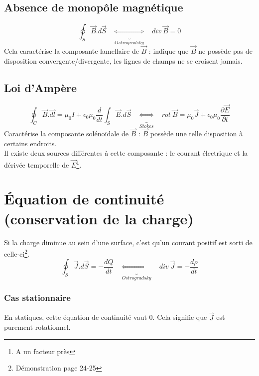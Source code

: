 \documentclass[11pt, a4paper, openany]{book}
\begin{document}
		\subsection{Absence de monopôle magnétique}
		\begin{equation}
		\oint_S \vec{B}.d\vec{S}\ \ \ \ \underbrace{\Leftrightarrow}_{Ostrogradsky}\ \ \ \ div\ \vec{B} = 0
		\end{equation}
		Cela caractérise la composante lamellaire de $\vec{B}$ : indique que $\vec{B}$ ne possède pas de disposition convergente/divergente, les lignes de champs ne se croisent jamais. \\
		
		
		\subsection{Loi d'Ampère}
		\begin{equation}
		\oint_C \vec{B}.\vec{dl} = \mu_0 I + \epsilon_0\mu_0\dfrac{d}{dt}\int_S \vec{E}.d\vec{S}\ \ \ \ \underbrace{\Leftrightarrow}_{Stokes}\ \ \ \ rot\ \vec{B} = \mu_0\vec{J} + \epsilon_0\mu_0 \dfrac{\partial \vec{E}}{\partial t}
		\end{equation}
		Caractérise la composante solénoïdale de $\vec{B}$ : $\vec{B}$ possède une telle disposition à certains endroits.\\
		Il existe deux sources différentes à cette composante : le courant électrique et la dérivée temporelle de $\vec{E}$\footnote{A un facteur près}.\\
		
		
		\section{Équation de continuité (conservation de la charge)}
		Si la charge diminue au sein d'une surface, c'est qu'un courant positif est sorti de celle-ci\footnote{Démonstration page 24-25}.
		\begin{equation}
		\oint_S \vec{J}.d\vec{S} = - \dfrac{dQ}{dt}\ \ \ \ \underbrace{\Leftrightarrow}_{Ostrogradsky}\ \ \ \ div\ \vec{J} = -\frac{d\rho}{dt}
		\end{equation}
		
		\subsubsection{Cas stationnaire}
		En statiques, cette équation de continuité vaut 0. Cela signifie que $\vec{J}$ est purement rotationnel.
		
\end{document}
